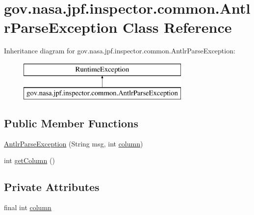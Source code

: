 \hypertarget{classgov_1_1nasa_1_1jpf_1_1inspector_1_1common_1_1_antlr_parse_exception}{}\section{gov.\+nasa.\+jpf.\+inspector.\+common.\+Antlr\+Parse\+Exception Class Reference}
\label{classgov_1_1nasa_1_1jpf_1_1inspector_1_1common_1_1_antlr_parse_exception}
Inheritance diagram for gov.\+nasa.\+jpf.\+inspector.\+common.\+Antlr\+Parse\+Exception\+:\begin{figure}[H]
\begin{center}
\leavevmode
\includegraphics[height=2.000000cm]{classgov_1_1nasa_1_1jpf_1_1inspector_1_1common_1_1_antlr_parse_exception}
\end{center}
\end{figure}
\subsection*{Public Member Functions}
\begin{DoxyCompactItemize}
\item 
\hyperlink{classgov_1_1nasa_1_1jpf_1_1inspector_1_1common_1_1_antlr_parse_exception_a09a1a74cfce63b50f9a5fd197fb91b4d}{Antlr\+Parse\+Exception} (String msg, int \hyperlink{classgov_1_1nasa_1_1jpf_1_1inspector_1_1common_1_1_antlr_parse_exception_ab4653ae852a2efd129c463e56377224a}{column})
\item 
int \hyperlink{classgov_1_1nasa_1_1jpf_1_1inspector_1_1common_1_1_antlr_parse_exception_abb87b37da9e95ff50cc2d483dc001d80}{get\+Column} ()
\end{DoxyCompactItemize}
\subsection*{Private Attributes}
\begin{DoxyCompactItemize}
\item 
final int \hyperlink{classgov_1_1nasa_1_1jpf_1_1inspector_1_1common_1_1_antlr_parse_exception_ab4653ae852a2efd129c463e56377224a}{column}
\end{DoxyCompactItemize}


